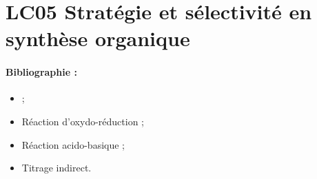 \section{LC05 Stratégie et sélectivité en synthèse organique}

\paragraph{Bibliographie :}
\begin{itemize}
\item ;
\end{itemize}

\niveau 

\prerequis
\begin{itemize}
\item Réaction d'oxydo-réduction ;
\item Réaction acido-basique ;
\item Titrage indirect.
\end{itemize}

\objectif